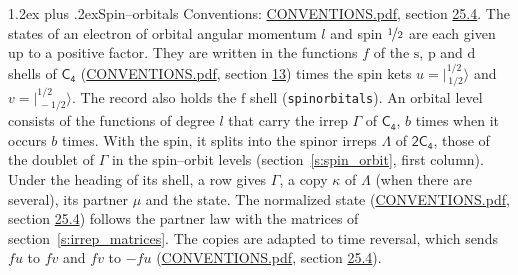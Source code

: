 \documentclass[10pt,a4paper]{article}
\makeatletter
\renewcommand\section{\@startsection{section}{1}{\z@}{-3ex plus -1ex minus -.2ex}%
  {1.2ex plus .2ex}{\normalfont\large\sffamily\bfseries\color{parttitle}}}
\numberwithin{equation}{section}
\newcommand{\grp}[1]{\mathsf{#1}}
\newcommand{\orbital}[1]{\mathrm{#1}}
\newcommand{\mult}{\kappa}
\newcommand{\intx}{\mu}
\newcommand{\jm}[2]{\bigl\lvert{}^{#1}_{\,#2}\bigr\rangle}
\makeatother
\begin{document}
\section{Spin--orbitals}\label{s:spin_orbitals}
Conventions: \href{../../CONVENTIONS.pdf}{CONVENTIONS.pdf}, section \href{../../CONVENTIONS.pdf\#conv.25.4}{25.4}.
\leavevmode\label{n:index.orbital.l}The states of an electron of orbital angular momentum $l$ and spin $\nicefrac{1}{2}$ are each given up to a positive factor. \label{n:local.spinor.uv}\label{n:local.function.f}They are written in the functions $f$ of the $\orbital{s}$, $\orbital{p}$ and $\orbital{d}$ shells of \href{../../../rotation/data/pdf/C4.pdf}{$\grp{C_{4}}$} (\href{../../CONVENTIONS.pdf}{CONVENTIONS.pdf}, section \href{../../../rotation/CONVENTIONS.pdf\#conv.13}{13}) times the spin kets $u = \jm{1/2}{1/2}$ and $v = \jm{1/2}{-1/2}$. The record also holds the $\orbital{f}$ shell (\texttt{spinorbitals}). An orbital level consists of the functions of degree $l$ that carry the irrep $\Gamma$ of \href{../../../rotation/data/pdf/C4.pdf}{$\grp{C_{4}}$}, $b$ times when it occurs $b$ times. With the spin, it splits into the spinor irreps $\Lambda$ of $\grp{2C_{4}}$, those of the doublet of $\Gamma$ in the spin--orbit levels (section~\ref{s:spin_orbit}, first column). \label{n:head.state}Under the heading of its shell, a row gives $\Gamma$, a copy $\mult$ of $\Lambda$ (when there are several), its partner $\intx$ and the state. The normalized state (\href{../../CONVENTIONS.pdf}{CONVENTIONS.pdf}, section \href{../../CONVENTIONS.pdf\#conv.25.4}{25.4}) follows the partner law with the matrices of section~\ref{s:irrep_matrices}. The copies are adapted to time reversal, which sends $f u$ to $f v$ and $f v$ to $-f u$ (\href{../../CONVENTIONS.pdf}{CONVENTIONS.pdf}, section \href{../../CONVENTIONS.pdf\#conv.25.4}{25.4}).
\end{document}
